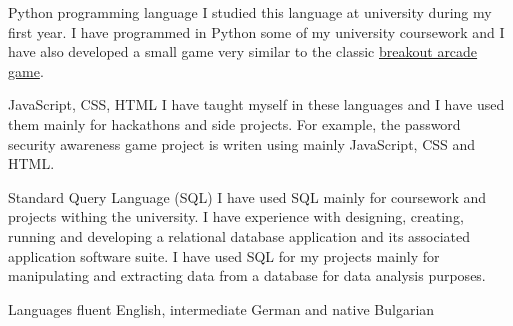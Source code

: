\documentclass{tccv}
\begin{document}
\begin{skillist}

\item{Python programming language} {I studied this language at university during my first year. I have programmed in Python some of my university coursework and I have also developed a small game very similar to the classic \href{http://en.wikipedia.org/wiki/Breakout_(video_game)}{breakout arcade game}.}

\item{JavaScript, CSS, HTML} {I have taught myself in these languages and I have used them mainly for hackathons and side projects. For example, the password security awareness game project is writen using mainly JavaScript, CSS and HTML.}

\item{Standard Query Language (SQL)} %
 {I have used SQL mainly for coursework and projects withing the university. I have experience with designing, creating, running and developing a relational database application and its associated application software suite. I have used SQL for my projects mainly for manipulating and extracting data from a database for data analysis purposes.}
\item {Languages } {fluent English, intermediate German and native Bulgarian}
\end{skillist}
\end{document}

